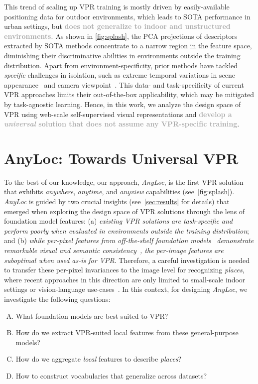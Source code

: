 \documentclass[letterpaper, 10 pt, conference]{ieeeconf}  \fi
\newcommand{\highlight}[1]{\textcolor{darkgray}{\textbf{#1}}}
\newcommand{\coolname}{\textit{AnyLoc}}
\begin{document}
This trend of scaling up VPR training is mostly driven by easily-available positioning data for outdoor environments, which leads to SOTA performance in urban settings, but \highlight{does not
generalize to indoor and unstructured environments.}
As shown in \cref{fig:splash}, the PCA projections of descriptors extracted by
SOTA methods concentrate to a narrow region in the feature space, diminishing their discriminative abilities in environments outside the training distribution.
Apart from environment-specificity, prior methods have tackled \textit{specific} challenges in isolation, such as extreme temporal variations in scene appearance~\cite{latif2018addressing,tang2020adversarial} and camera viewpoint~\cite{garg2018lost,gawel2018x}.
This data- and task-specificity of current VPR approaches limits their out-of-the-box applicability, which
may be mitigated by task-agnostic learning.
Hence, in this work, we analyze the design space of VPR using web-scale self-supervised visual representations and \highlight{develop a \emph{universal} solution that does not assume any VPR-specific training}.
 
\section{AnyLoc: Towards Universal VPR}
\label{sec:foundloc}

To the best of our knowledge, our approach, \coolname{}, is the first VPR solution that exhibits \textit{anywhere}, \textit{anytime}, and \textit{anyview} capabilities (see~\cref{fig:splash}).
\coolname{} is guided by two crucial insights (see~\cref{sec:results} for details) that emerged when exploring the design space of VPR solutions through the lens of foundation model features: 
(a) \textit{existing VPR solutions are task-specific and perform poorly when evaluated in environments outside the training distribution}; 
and 
(b) \textit{while per-pixel features from off-the-shelf foundation models~\cite{caron2021emerging,oquab2023dinov2,radford2021learning} demonstrate remarkable visual and semantic consistency~\cite{park2023self,shekhar2023objectives,jatavallabhula2023conceptfusion,amir2021deep},
the per-image features are suboptimal when used as-is for VPR}.
Therefore, a careful investigation is needed to transfer these per-pixel invariances to the image level for recognizing \textit{places}, where recent approaches in this direction are only limited to small-scale indoor settings or vision-language use-cases~\cite{mirjalili2023fm, kassab2023clip}.
In this context, for designing \coolname{}, we investigate the following questions:
\begin{enumerate}[A.]
\item What foundation models are best suited to VPR?
\item How do we extract VPR-suited local features from these general-purpose models?
\item How do we aggregate \emph{local} features to describe \emph{places}?
\item How to construct vocabularies that generalize across datasets?
\end{enumerate}
\end{document}
